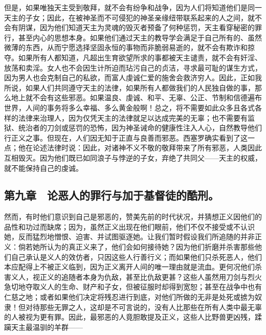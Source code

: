 但是，如果唯独天主受到敬拜，就不会有纷争和战争，因为人们将知道他们是同一天主的子女；因此，在被神圣而不可侵犯的神圣亲缘纽带联系起来的人之间，就不会有阴谋，因为他们知道天主为灵魂的毁灭者预备了何种惩罚，天主看穿秘密的罪行，甚至内心的思想本身。如果他们通过天主的教导学会满足于自己所有的、虽然微薄的东西，从而宁愿选择坚固永恒的事物而非脆弱易逝的，就不会有欺诈和掠夺。如果所有人都知道，凡超出生育欲望所求的事都被天主谴责，就不会有奸淫、放荡和卖淫。女人也不会因生计所迫而玷污自己的贞洁，寻求最可耻的谋生方式，因为男人也会克制自己的私欲，而富人虔诚仁爱的施舍会救济穷人。因此，正如我所说，如果人们共同遵守天主的法律，如果所有人都做我们的人民独自做的事，那么地上就不会有这些邪恶。如果温良、虔诚、和平、无辜、公正、节制和信德遍布世界，人间的事务将多么幸福、多么黄金般啊！总之，将不需要如此众多且各式各样的法律来治理人，因为仅凭天主的法律就足以达成完美的无辜；也不需要有监狱、统治者的刀剑或惩罚的恐怖，因为神圣诫命的健康性注入人心，自然教导他们行正义之事。但现在，人们因无知于正直与良善而邪恶。西塞罗确实看到了这一点；他在论述法律时说：因此，对诸神不义不敬的敬拜带来了所有邪恶，人类因此互相毁灭。因为他们既已如同浪子与悖逆的子女，弃绝了共同父——天主的权威，就不能保持自己的虔诚。\par


\subsection{第九章　论恶人的罪行与加于基督徒的酷刑。}

然而，有时他们意识到自己是邪恶的，赞美先前的时代状况，并猜想正义因他们的品性和功过而缺席；因为，虽然正义出现在他们眼前，他们不仅不接受或不认识她，反而猛烈地憎恨、迫害、并试图驱逐她。让我们暂时假设我们所追随的并非正义：倘若她所认为的真正义来了，他们会如何接待她？因为他们折磨并杀害那些他们自己承认是义人的效仿者，只因这些人行善行义；而如果他们只杀死恶人，他们本应配得上不被正义临到，因为正义离开人间的唯一理由就是流血。更何况他们杀害义人，视正义的追随者本身为仇敌，甚至比仇敌更甚？这些人虽然用刀剑与烈火急切地夺取义人的生命、财产和子女，但被征服时却得到宽恕；甚至在战争中也有仁慈之地；或者如果他们决定将残忍进行到底，对他们所做的无非是处死或掳为奴隶！但对待那些无罪之人，这却是不可言说的，没有人比那些在所有人类中最无辜的人被视为更有罪。因此，最邪恶的人竟胆敢提及正义，这些人比野兽更凶残，蹂躏天主最温驯的羊群——\par

